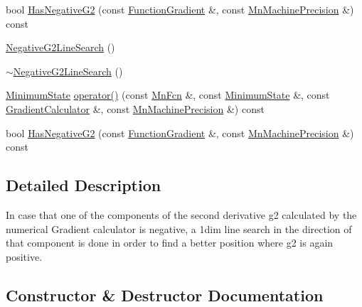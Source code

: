 \begin{DoxyCompactItemize}
\item 
bool \mbox{\hyperlink{classROOT_1_1Minuit2_1_1NegativeG2LineSearch_a5450b0e5a0144e9c3e6028e8ae4a2c76}{Has\+Negative\+G2}} (const \mbox{\hyperlink{classROOT_1_1Minuit2_1_1FunctionGradient}{Function\+Gradient}} \&, const \mbox{\hyperlink{classROOT_1_1Minuit2_1_1MnMachinePrecision}{Mn\+Machine\+Precision}} \&) const
\item 
\mbox{\hyperlink{classROOT_1_1Minuit2_1_1NegativeG2LineSearch_ac0cff4c81f89a72be26214633c14cd0e}{Negative\+G2\+Line\+Search}} ()
\item 
\mbox{\hyperlink{classROOT_1_1Minuit2_1_1NegativeG2LineSearch_a0ef5274da3c1466f321da0d596bf7a55}{$\sim$\+Negative\+G2\+Line\+Search}} ()
\item 
\mbox{\hyperlink{classROOT_1_1Minuit2_1_1MinimumState}{Minimum\+State}} \mbox{\hyperlink{classROOT_1_1Minuit2_1_1NegativeG2LineSearch_ac39ff4c0d14335bd8c8bdcede066ecdf}{operator()}} (const \mbox{\hyperlink{classROOT_1_1Minuit2_1_1MnFcn}{Mn\+Fcn}} \&, const \mbox{\hyperlink{classROOT_1_1Minuit2_1_1MinimumState}{Minimum\+State}} \&, const \mbox{\hyperlink{classROOT_1_1Minuit2_1_1GradientCalculator}{Gradient\+Calculator}} \&, const \mbox{\hyperlink{classROOT_1_1Minuit2_1_1MnMachinePrecision}{Mn\+Machine\+Precision}} \&) const
\item 
bool \mbox{\hyperlink{classROOT_1_1Minuit2_1_1NegativeG2LineSearch_a5450b0e5a0144e9c3e6028e8ae4a2c76}{Has\+Negative\+G2}} (const \mbox{\hyperlink{classROOT_1_1Minuit2_1_1FunctionGradient}{Function\+Gradient}} \&, const \mbox{\hyperlink{classROOT_1_1Minuit2_1_1MnMachinePrecision}{Mn\+Machine\+Precision}} \&) const
\end{DoxyCompactItemize}


\subsection{Detailed Description}
In case that one of the components of the second derivative g2 calculated by the numerical Gradient calculator is negative, a 1dim line search in the direction of that component is done in order to find a better position where g2 is again positive. 

\subsection{Constructor \& Destructor Documentation}
\mbox{\label{classROOT_1_1Minuit2_1_1NegativeG2LineSearch_ac0cff4c81f89a72be26214633c14cd0e}} 
